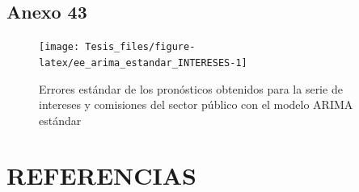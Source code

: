 \documentclass[
]{article}
\begin{document}
\subsection{Anexo 43}

\begin{figure}[H]
\texttt{[image: Tesis\_files/figure-latex/ee\_arima\_estandar\_INTERESES-1]} \caption{Errores estándar de los pronósticos obtenidos para la serie de intereses y comisiones del sector público con el modelo ARIMA estándar \textcolor{white}{prueba de aaaaaaaaaaaaaaaaaaaaaaa}}\label{fig:ee_arima_estandar_INTERESES}
\end{figure}

\newpage

\section{REFERENCIAS}
\end{document}
